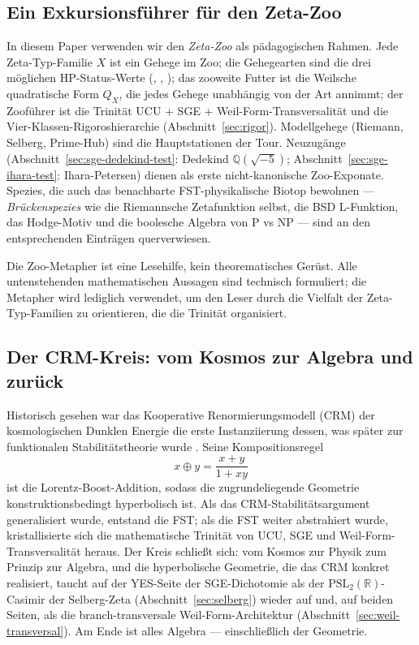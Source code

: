 \documentclass[11pt]{article}
\theoremstyle{definition}
\theoremstyle{remark}
\newcommand{\PSL}{\mathrm{PSL}}
\begin{document}
\subsection{Ein Exkursionsführer für den Zeta-Zoo}
\label{sec:zoo-framing}

In diesem Paper verwenden wir den \emph{Zeta-Zoo} als pädagogischen
Rahmen. Jede Zeta-Typ-Familie $X$ ist ein Gehege im Zoo; die Gehegearten sind die drei möglichen
HP-Status-Werte (, , ); das zooweite Futter ist die
Weilsche quadratische Form $Q_X$, die jedes Gehege unabhängig von der Art annimmt;
der Zooführer ist die Trinität UCU + SGE + Weil-Form-Transversalität und die
Vier-Klassen-Rigoroshierarchie (Abschnitt~\ref{sec:rigor}). Modellgehege (Riemann,
Selberg, Prime-Hub) sind die Hauptstationen der Tour. Neuzugänge
(Abschnitt~\ref{sec:sge-dedekind-test}: Dedekind $\mathbb{Q}(\sqrt{-5})$;
Abschnitt~\ref{sec:sge-ihara-test}: Ihara-Petersen) dienen als erste nicht-kanonische Zoo-Exponate.
Spezies, die auch das benachbarte FST-physikalische Biotop
\cite{RFEPFramework} bewohnen --- \emph{Brückenspezies} wie die Riemannsche Zetafunktion selbst,
die BSD L-Funktion, das Hodge-Motiv und die boolesche Algebra von P vs NP ---
sind an den entsprechenden Einträgen querverwiesen.

Die Zoo-Metapher ist eine Lesehilfe, kein theorematisches Gerüst. Alle
untenstehenden mathematischen Aussagen sind technisch formuliert; die
Metapher wird lediglich verwendet, um den Leser durch die Vielfalt der Zeta-Typ-Familien
zu orientieren, die die Trinität organisiert.

\subsection{Der CRM-Kreis: vom Kosmos zur Algebra und zurück}
\label{sec:crm-circle}

Historisch gesehen war das Kooperative Renormierungsmodell (CRM) der
kosmologischen Dunklen Energie die erste Instanziierung dessen, was später zur
funktionalen Stabilitätstheorie wurde \cite{RFEPFramework}. Seine
Kompositionsregel
\[
  x \oplus y = \frac{x + y}{1 + xy}
\]
ist die Lorentz-Boost-Addition, sodass die zugrundeliegende Geometrie
konstruktionsbedingt hyperbolisch ist. Als das CRM-Stabilitätsargument
generalisiert wurde, entstand die FST; als die FST weiter abstrahiert wurde,
kristallisierte sich die mathematische Trinität von UCU, SGE und Weil-Form-Transversalität
heraus. Der Kreis schließt sich: vom Kosmos zur Physik zum Prinzip zur Algebra,
und die hyperbolische Geometrie, die das CRM konkret realisiert,
taucht auf der YES-Seite der SGE-Dichotomie als der $\PSL_2(\mathbb{R})$-Casimir
der Selberg-Zeta (Abschnitt~\ref{sec:selberg}) wieder auf und, auf beiden Seiten,
als die branch-transversale Weil-Form-Architektur (Abschnitt~\ref{sec:weil-transversal}).
Am Ende ist alles Algebra --- einschließlich der Geometrie.
\end{document}
